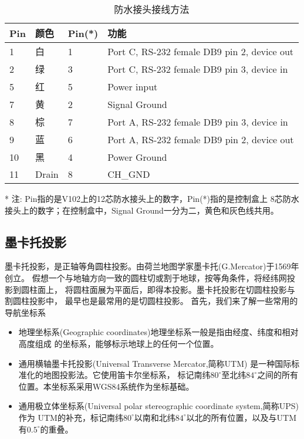 \begin{table}[htbp]
  \centering
  \caption{防水接头接线方法}
    \begin{tabular}{lp{3.25em}lp{19.25em}}
    \toprule
    \multicolumn{1}{p{3.125em}}{Pin} & 颜色    & \multicolumn{1}{p{3.29em}}{Pin(*)} & 功能 \\
    \midrule
    1     & 白     & 1     & Port C, RS-232 female DB9 pin 2, device out \\
    2     & 绿     & 3     & Port C, RS-232 female DB9 pin 3, device in \\
    5     & 红     & 5     & Power input \\
    7     & 黄     & 2     & Signal Ground \\
    8     & 棕     & 7     & Port A, RS-232 female DB9 pin 3, device in \\
    9     & 蓝     & 6     & Port A, RS-232 female DB9 pin 2, device out \\
    10    & 黑     & 4     & Power Ground \\
    11    & Drain  & 8     & CH\_GND \\
    \bottomrule
    \end{tabular}%
    \begin{tablenotes}
        \footnotesize
        \item[*] 注: Pin指的是V102上的12芯防水接头上的数字，Pin(*)指的是控制盒上
        8芯防水接头上的数字；在控制盒中，Signal Ground一分为二，黄色和灰色线共用。
    \end{tablenotes}
  \label{tab:pluginconnect}%
\end{table}%


\subsection{墨卡托投影}
墨卡托投影，是正轴等角圆柱投影。由荷兰地图学家墨卡托(G.Mercator)于1569年创立。
假想一个与地轴方向一致的圆柱切或割于地球，按等角条件，将经纬网投影到圆柱面上，
将圆柱面展为平面后，即得本投影。墨卡托投影在切圆柱投影与割圆柱投影中，
最早也是最常用的是切圆柱投影。
首先，我们来了解一些常用的导航坐标系
\begin{itemize}
  \item 地理坐标系(Geographic coordinates)地理坐标系一般是指由经度、纬度和相对高度组成
  的坐标系，能够标示地球上的任何一个位置。
  \item 通用横轴墨卡托投影(Universal Transverse Mercator,简称UTM) \cite{hager1989universal} 是一种国际标准化的地图投影法。它使用笛卡尔坐标系，
  标记南纬$80^{\circ}$至北纬$84^{\circ}$之间的所有位置。本坐标系采用WGS84系统作为坐标基础。
  \item 通用极立体坐标系(Universal polar stereographic coordinate system,简称UPS)作为
  UTM的补充，标记南纬$80^{\circ}$以南和北纬$84^{\circ}$以北的所有位置，以及与UTM有$0.5^{\circ}$的重叠。
\end{itemize}

